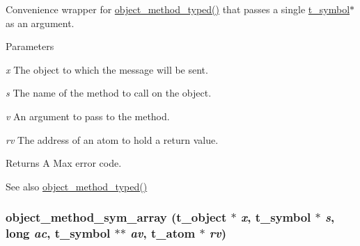 Convenience wrapper for \hyperlink{group__obj_ga443dee482af22e0fe83e68955d367226}{object\_\-method\_\-typed()} that passes a single \hyperlink{structt__symbol}{t\_\-symbol}$\ast$ as an argument. 
\begin{DoxyParams}{Parameters}
\item[{\em x}]The object to which the message will be sent. \item[{\em s}]The name of the method to call on the object. \item[{\em v}]An argument to pass to the method. \item[{\em rv}]The address of an atom to hold a return value.\end{DoxyParams}
\begin{DoxyReturn}{Returns}
A Max error code. 
\end{DoxyReturn}
\begin{DoxySeeAlso}{See also}
\hyperlink{group__obj_ga443dee482af22e0fe83e68955d367226}{object\_\-method\_\-typed()} 
\end{DoxySeeAlso}
\hypertarget{group__obj_ga2a4bb953a5f7a9afee4f2f8196c4226e}{
\subsubsection[{object\_\-method\_\-sym\_\-array}]{ object\_\-method\_\-sym\_\-array ({\bf t\_\-object} $\ast$ {\em x}, \/  {\bf t\_\-symbol} $\ast$ {\em s}, \/  long {\em ac}, \/  {\bf t\_\-symbol} $\ast$$\ast$ {\em av}, \/  {\bf t\_\-atom} $\ast$ {\em rv})}}
\label{group__obj_ga2a4bb953a5f7a9afee4f2f8196c4226e}


